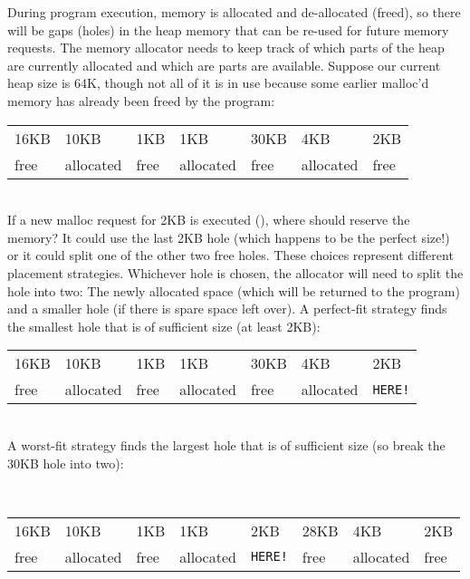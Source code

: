 During program execution, memory is allocated and de-allocated (freed), so there will be gaps (holes) in the heap memory that can be re-used for future memory requests. The memory allocator needs to keep track of which parts of the heap are currently allocated and which are parts are available. Suppose our current heap size is 64K, though not all of it is in use because some earlier malloc'd memory has already been freed by the program:
\\
\begin{center}
\begin{tabularx}{\textwidth}{ | X | X | X | X | X | X | X | }
\hline
16KB & 10KB & 1KB & 1KB & 30KB & 4KB & 2KB \\
free & allocated & free & allocated & free & allocated & free \\
\hline
\end{tabularx}
\end{center}
\\
If a new malloc request for 2KB is executed (), where should  reserve the memory? It could use the last 2KB hole (which happens to be the perfect size!) or it could split one of the other two free holes. These choices represent different placement strategies. Whichever hole is chosen, the allocator will need to split the hole into two: The newly allocated space (which will be returned to the program) and a smaller hole (if there is spare space left over). A perfect-fit strategy finds the smallest hole that is of sufficient size (at least 2KB):
\\
\begin{center}
\begin{tabularx}{\textwidth}{ | X | X | X | X | X | X | X | }
\hline
16KB & 10KB & 1KB & 1KB & 30KB & 4KB & 2KB \\
free & allocated & free & allocated & free & allocated & \texttt{HERE!} \\
\hline
\end{tabularx}
\end{center}
\\

A worst-fit strategy finds the largest hole that is of sufficient size (so break the 30KB hole into two):

\\
\begin{center}
\begin{tabularx}{\textwidth}{ | X | X | X | X | X | X | X | X | }
\hline
16KB & 10KB & 1KB & 1KB & 2KB & 28KB & 4KB & 2KB \\
free & allocated & free & allocated & \texttt{HERE!} & free & allocated & free \\
\hline
\end{tabularx}
\end{center}
\\

